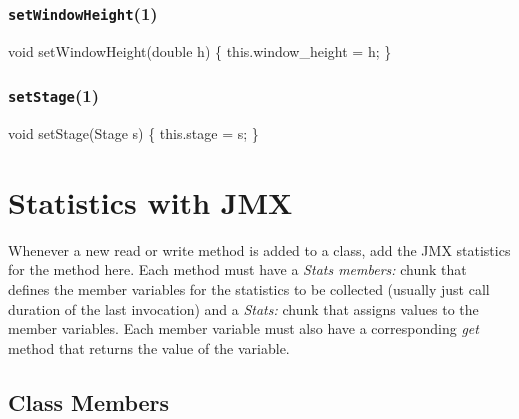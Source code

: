 \subsection{\texttt{setWindowHeight}(1)}
\nwenddocs{}\endmoddef{}
void setWindowHeight(double h) \{
  this.window_height = h;
\}
\eatline
{}\nwendcode{}\nwdocspar
\subsection{\texttt{setStage}(1)}
\nwenddocs{}\endmoddef{}
void setStage(Stage s) \{
  this.stage = s;
\}
\eatline
{}\nwendcode{}\nwdocspar
\nwenddocs{}\chapter{Statistics with JMX}
\label{jmx}

Whenever a new read or write method is added to a class, add the JMX statistics
for the method here. Each method must have a \textit{Stats members:} chunk that
defines the member variables for the statistics to be collected (usually just
call duration of the last invocation) and a \textit{Stats:} chunk that assigns
values to the member variables. Each member variable must also have a
corresponding \textit{get} method that returns the value of the variable.

\section{Class Members}
